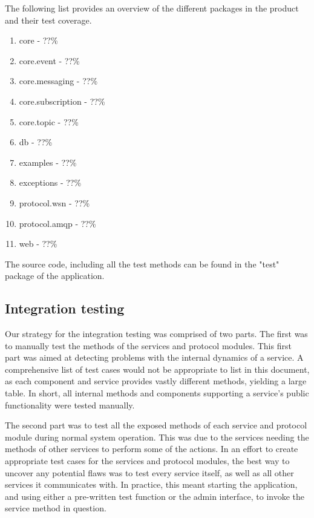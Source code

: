 The following list provides an overview of the different packages in the product and their test coverage.

\begin{enumerate}
\item core - ??\%
\item core.event - ??\%
\item core.messaging - ??\%
\item core.subscription - ??\%
\item core.topic - ??\%
\item db - ??\%
\item examples - ??\%
\item exceptions - ??\%
\item protocol.wsn - ??\%
\item protocol.amqp - ??\%
\item web - ??\%
\end{enumerate}

The source code, including all the test methods can be found in the "test" package of the application.

\subsection{Integration testing}
\label{subsec:testing-test_execution-integration_testing}

Our strategy for the integration testing was comprised of two parts. The first was to manually test the methods of the services and protocol modules. This first part was aimed at detecting problems with the internal dynamics of a service. A comprehensive list of test cases would not be appropriate to list in this document, as each component and service provides vastly different methods, yielding a large table. In short, all internal methods and components supporting a service's public functionality were tested manually.

The second part was to test all the exposed methods of each service and protocol module during normal system operation. This was due to the services needing the methods of other services to perform some of the actions. In an effort to create appropriate test cases for the services and protocol modules, the best way to uncover any potential flaws was to test every service itself, as well as all other services it communicates with. In practice, this meant starting the application, and using either a pre-written test function or the admin interface, to invoke the service method in question.

